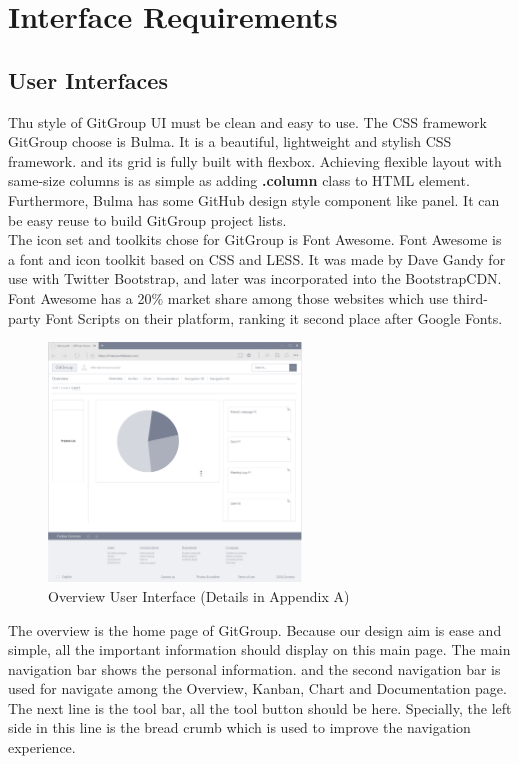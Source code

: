 \documentclass[12pt,a4paper]{report}
\begin{document}
\chapter{Interface Requirements}
\section{User Interfaces}
Thu style of GitGroup UI must be clean and easy to use. The CSS framework GitGroup choose is Bulma. It is a beautiful, lightweight and stylish CSS framework. and its grid is fully built with flexbox. Achieving flexible layout with same-size columns is as simple as adding \textbf{.column} class to HTML element. Furthermore, Bulma has some GitHub design style component like panel. It can be easy reuse to build GitGroup project lists.\\
The icon set and toolkits chose for GitGroup is Font Awesome. Font Awesome is a font and icon toolkit based on CSS and LESS. It was made by Dave Gandy for use with Twitter Bootstrap, and later was incorporated into the BootstrapCDN. Font Awesome \cite{wiki:fontawesome} has a 20\% market share among those websites which use third-party Font Scripts on their platform, ranking it second place after Google Fonts.
\begin{figure}[H]
	\centering
	\includegraphics[width=0.6\textwidth]{./pics/OverviewInterface.png}
	\caption{Overview User Interface (Details in Appendix A)}
\end{figure}
The overview is the home page of GitGroup. Because our design aim is ease and simple, all the important information should display on this main page. The main navigation bar shows the personal information. and the second navigation bar is used for navigate among the Overview, Kanban, Chart and Documentation page. The next line is the tool bar, all the tool button should be here. Specially, the left side in this line is the bread crumb which is used to improve the navigation experience. 
\end{document}
